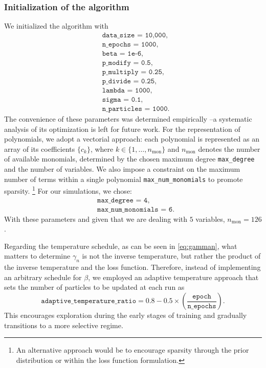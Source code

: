 \documentclass[11pt,a4paper]{article}
\newcommand{\gl}[1]{\marginpar{\parbox{\marginparwidth}{\boldmath $\Longleftarrow$}}{\boldmath\bfseries (gl: #1)}}
\newcommand{\bd}[1]{\marginpar{\parbox{\marginparwidth}{\boldmath $\Longleftarrow$}}{\boldmath\bfseries (bd: #1)}}
\begin{document}
	
	\subsubsection{Initialization of the algorithm}
	
	We initialized the algorithm with
	\begin{equation}	\label{eq:sample10000adaptativetemp}
		\begin{aligned}
			&\texttt{data\_size = 10,000},\\
			&\texttt{n\_epochs = 1000},\\
			&\texttt{beta  = 1e-6}, \\
			&\texttt{p\_{modify} = 0.5},\\
			&\texttt{p\_{multiply} = 0.25},\\
			&\texttt{p\_{divide} = 0.25},\\
			&\texttt{lambda = 1000},\\
			&\texttt{sigma = 0.1},\\
			&\texttt{n\_particles = 1000}.
		\end{aligned}
	\end{equation}
	The convenience of these parameters was determined empirically --a systematic analysis of its optimization is left for future work. For the representation of polynomials, we adopt a vectorial approach: each polynomial is represented as an array of its coefficients $\{c_k\}$, where $k \in \{1,\dots,n_{\text{mon}}\}$ and $n_{\text{mon}}$ denotes the number of available monomials, determined by the chosen maximum degree \texttt{max\_degree} and the number of variables. We also impose a constraint on the maximum number of terms within a single polynomial \texttt{max\_num\_monomials} to promote sparsity. \footnote{An alternative approach would be to encourage sparsity through the prior distribution or within the loss function formulation.} For our simulations, we chose:
	\begin{equation} \label{eq:parampol}
		\begin{aligned}
			&\texttt{max\_degree = 4},\\
			&\texttt{max\_num\_monomials = 6.}
		\end{aligned}
	\end{equation}
With these parameters and given that we are dealing with $5$ variables, $n_{\text{mon}} = 126$.
	
	Regarding the temperature schedule, as can be seen in \eqref{eq:gamman}, what matters to determine $\gamma_{n}$ is not the inverse temperature, but rather the product of the inverse temperature and the loss function. Therefore, instead of implementing an arbitrary schedule for $\beta$, we employed an adaptive temperature approach that sets the number of particles to be updated at each run as
		\begin{equation} \label{eq:eqadaptivetemperatureschedule}
			\texttt{adaptive\_temperature\_ratio} = 0.8 - 0.5 \times \left(\frac{\texttt{epoch}}{\texttt{n\_epochs}}\right).
		\end{equation}
This encourages exploration during the early stages of training and gradually transitions to a more selective regime. %
\end{document}
